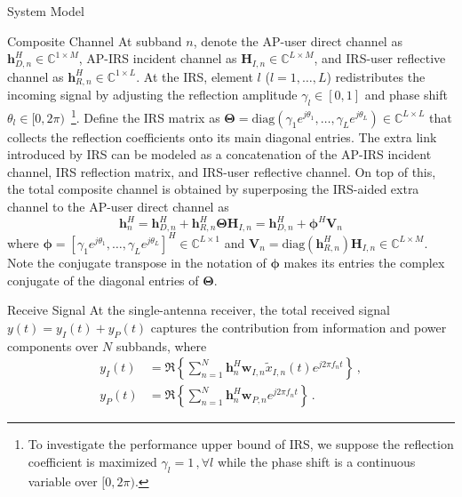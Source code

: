 \documentclass[journal]{IEEEtran}
\begin{document}
\begin{section}{System Model}
		\begin{subsection}{Composite Channel}
			At subband $n$, denote the AP-user direct channel as $\boldsymbol{h}_{D,n}^H \in \mathbb{C}^{1 \times M}$, AP-IRS incident channel as $\boldsymbol{H}_{I,n} \in \mathbb{C}^{L \times M}$, and IRS-user reflective channel as $\boldsymbol{h}_{R,n}^H \in \mathbb{C}^{1 \times L}$. At the IRS, element $l$ ($l=1,\dots,L$) redistributes the incoming signal by adjusting the reflection amplitude $\gamma_l \in [0,1]$ and phase shift $\theta_l \in [0,2\pi)$~\footnote{To investigate the performance upper bound of IRS, we suppose the reflection coefficient is maximized $\gamma_l=1\,,\forall l$ while the phase shift is a continuous variable over $[0,2\pi)$.}. Define the IRS matrix as $\boldsymbol{\Theta} = \mathrm{diag}(\gamma_1 e^{j \theta_1}, \dots, \gamma_L e^{j \theta_L}) \in \mathbb{C}^{L \times L}$ that collects the reflection coefficients onto its main diagonal entries. The extra link introduced by IRS can be modeled as a concatenation of the AP-IRS incident channel, IRS reflection matrix, and IRS-user reflective channel. On top of this, the total composite channel is obtained by superposing the IRS-aided extra channel to the AP-user direct channel as
			\begin{equation}\label{eq:h_n}
				\boldsymbol{h}_{n}^H = \boldsymbol{h}_{D,n}^H + \boldsymbol{h}_{R,n}^H \boldsymbol{\Theta} \boldsymbol{H}_{I,n} = \boldsymbol{h}_{D,n}^H + \boldsymbol{\phi}^H \boldsymbol{V}_{n}
			\end{equation}
			where $\boldsymbol{\phi}=[\gamma_1 e^{j \theta_1}, \dots, \gamma_L e^{j \theta_L}]^H \in \mathbb{C}^{L \times 1}$ and $\boldsymbol{V}_{n}=\mathrm{diag}(\boldsymbol{h}_{R,n}^H)\boldsymbol{H}_{I,n} \in \mathbb{C}^{L \times M}$. Note the conjugate transpose in the notation of $\boldsymbol{\phi}$ makes its entries the complex conjugate of the diagonal entries of $\boldsymbol{\Theta}$.
		\end{subsection}


		\begin{subsection}{Receive Signal}
			At the single-antenna receiver, the total received signal $y(t)=y_I(t)+y_P(t)$ captures the contribution from information and power components over $N$ subbands, where
			\begin{align}
				y_{I}(t) & = \Re\left\{\sum_{n=1}^N{\boldsymbol{h}_{n}^H}{\boldsymbol{w}_{I,n}\tilde{x}_{I,n}(t)}{e^{j2{\pi}{f_n}{t}}}\right\}\,,\label{eq:y_I}\\
				y_{P}(t) & = \Re\left\{\sum_{n=1}^N{\boldsymbol{h}_{n}^H}\boldsymbol{w}_{P,n}{e^{j2{\pi}{f_n}{t}}}\right\}\,.\label{eq:y_P}
			\end{align}
		\end{subsection}



\end{section}
\end{document}
